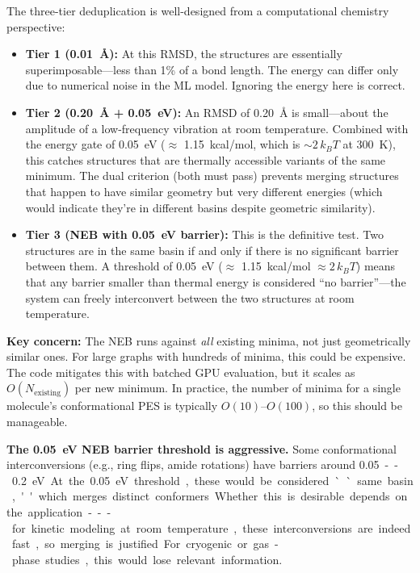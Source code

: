 \documentclass[11pt,a4paper]{article}
\begin{document}
\begin{evaluation}
The three-tier deduplication is well-designed from a computational chemistry perspective:

\begin{itemize}
    \item \textbf{Tier 1 (\SI{0.01}{\angstrom}):} At this RMSD, the structures are essentially superimposable---less than 1\% of a bond length. The energy can differ only due to numerical noise in the ML model. Ignoring the energy here is correct.

    \item \textbf{Tier 2 (\SI{0.20}{\angstrom} + \SI{0.05}{eV}):} An RMSD of \SI{0.20}{\angstrom} is small---about the amplitude of a low-frequency vibration at room temperature. Combined with the energy gate of \SI{0.05}{eV} ($\approx$ \SI{1.15}{kcal/mol}, which is $\sim 2\,k_BT$ at \SI{300}{K}), this catches structures that are thermally accessible variants of the same minimum. The dual criterion (both must pass) prevents merging structures that happen to have similar geometry but very different energies (which would indicate they're in different basins despite geometric similarity).

    \item \textbf{Tier 3 (NEB with \SI{0.05}{eV} barrier):} This is the definitive test. Two structures are in the same basin if and only if there is no significant barrier between them. A threshold of \SI{0.05}{eV} ($\approx$ \SI{1.15}{kcal/mol} $\approx 2\,k_BT$) means that any barrier smaller than thermal energy is considered ``no barrier''---the system can freely interconvert between the two structures at room temperature.
\end{itemize}

\textbf{Key concern:} The NEB runs against \emph{all} existing minima, not just geometrically similar ones. For large graphs with hundreds of minima, this could be expensive. The code mitigates this with batched GPU evaluation, but it scales as $O(N_\text{existing})$ per new minimum. In practice, the number of minima for a single molecule's conformational PES is typically $O(10)$--$O(100)$, so this should be manageable.

\textbf{The \SI{0.05}{eV} NEB barrier threshold is aggressive.} Some conformational interconversions (e.g., ring flips, amide rotations) have barriers around \SI{0.05}--\SI{0.2}{eV}. At the \SI{0.05}{eV} threshold, these would be considered ``same basin,'' which merges distinct conformers. Whether this is desirable depends on the application---for kinetic modeling at room temperature, these interconversions are indeed fast, so merging is justified. For cryogenic or gas-phase studies, this would lose relevant information.
\end{evaluation}
\end{document}
